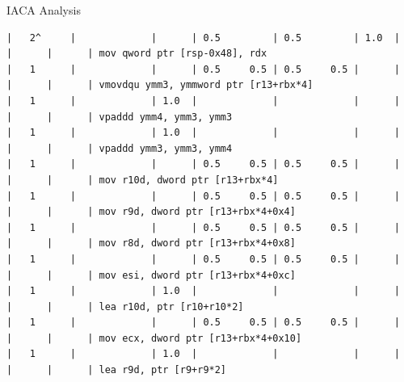 \documentclass[aspectratio=169,t]{beamer}
\begin{document}
\begin{frame}[fragile]{IACA Analysis}
\begin{lstlisting}[basicstyle=\tt\fontsize{4pt}{6pt}\selectfont]
|   2^     |             |      | 0.5         | 0.5         | 1.0  |      |      |      | mov qword ptr [rsp-0x48], rdx
|   1      |             |      | 0.5     0.5 | 0.5     0.5 |      |      |      |      | vmovdqu ymm3, ymmword ptr [r13+rbx*4]
|   1      |             | 1.0  |             |             |      |      |      |      | vpaddd ymm4, ymm3, ymm3
|   1      |             | 1.0  |             |             |      |      |      |      | vpaddd ymm3, ymm3, ymm4
|   1      |             |      | 0.5     0.5 | 0.5     0.5 |      |      |      |      | mov r10d, dword ptr [r13+rbx*4]
|   1      |             |      | 0.5     0.5 | 0.5     0.5 |      |      |      |      | mov r9d, dword ptr [r13+rbx*4+0x4]
|   1      |             |      | 0.5     0.5 | 0.5     0.5 |      |      |      |      | mov r8d, dword ptr [r13+rbx*4+0x8]
|   1      |             |      | 0.5     0.5 | 0.5     0.5 |      |      |      |      | mov esi, dword ptr [r13+rbx*4+0xc]
|   1      |             | 1.0  |             |             |      |      |      |      | lea r10d, ptr [r10+r10*2]
|   1      |             |      | 0.5     0.5 | 0.5     0.5 |      |      |      |      | mov ecx, dword ptr [r13+rbx*4+0x10]
|   1      |             | 1.0  |             |             |      |      |      |      | lea r9d, ptr [r9+r9*2]
    \end{lstlisting}
  \end{frame}
\end{document}
